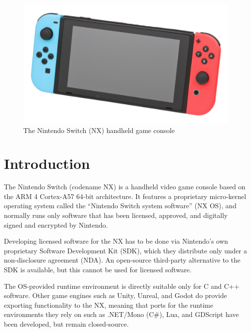 \documentclass[format=sigconf]{acmart}
\begin{document}

\maketitle

\def\abovecaptionskip{1pt}
\def\listingautorefname{Listing}
\def\figureautorefname{Figure}

\begin{figure}[h]
  \centering
  \includegraphics[width=\linewidth]{switch.jpg}
  \caption{The Nintendo Switch (NX) handheld game console}
\end{figure}

\section{Introduction}\label{introduction}
The Nintendo Switch (codename NX) is a handheld video game console based on the ARM 4 Cortex-A57 64-bit architecture\cite{morgan2020}. It features a proprietary micro-kernel operating system called the ``Nintendo Switch system software''\cite{roussel2019methodically} (NX OS), and normally runs only software that has been licensed, approved, and digitally signed and encrypted by Nintendo.

Developing licensed software for the NX has to be done via Nintendo's own proprietary Software Development Kit (SDK), which they distribute only under a non-disclosure agreement (NDA). An open-source third-party alternative to the SDK is available\cite{switchbrew}, but this cannot be used for licensed software.

The OS-provided runtime environment is directly suitable only for C and C++ software. Other game engines such as Unity, Unreal, and Godot do provide exporting functionality to the NX, meaning that ports for the runtime environments they rely on such as .NET/Mono (C\#), Lua, and GDScript have been developed, but remain closed-source.
\end{document}
